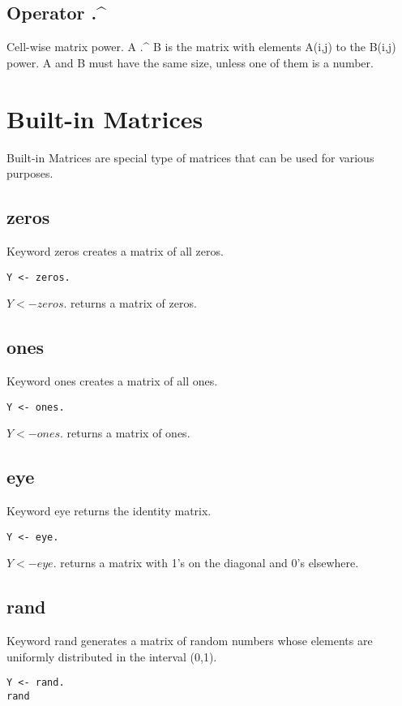 \documentclass[prodmode,acmtecs]{acmsmall}
\begin{document}
\subsection{Operator .\^{}}
Cell-wise matrix power. A .\^{} B is the matrix with elements A(i,j) to
the B(i,j) power. A and B must have the same size, unless one of them
is a number.

\section{Built-in Matrices}
Built-in Matrices are special type of matrices that can be used for
various purposes.
\medskip

\subsection{zeros}
Keyword zeros creates a matrix of all zeros.
\begin{lstlisting}
Y <- zeros.
\end{lstlisting}

$Y <- zeros.$ returns a matrix of zeros.
\medskip

\subsection{ones}
Keyword ones creates a matrix of all ones.
\begin{lstlisting}
Y <- ones.
\end{lstlisting}

$Y <- ones.$ returns a matrix of ones.
\medskip

\subsection{eye}
Keyword eye returns the identity matrix.
\begin{lstlisting}
Y <- eye.
\end{lstlisting}

$Y <- eye.$ returns a matrix with 1's on the diagonal and 0's elsewhere.
\medskip

\subsection{rand}
Keyword rand generates a matrix of random numbers whose elements are
uniformly distributed in the interval (0,1).
\begin{lstlisting}
Y <- rand.
rand
\end{lstlisting}
\end{document}
